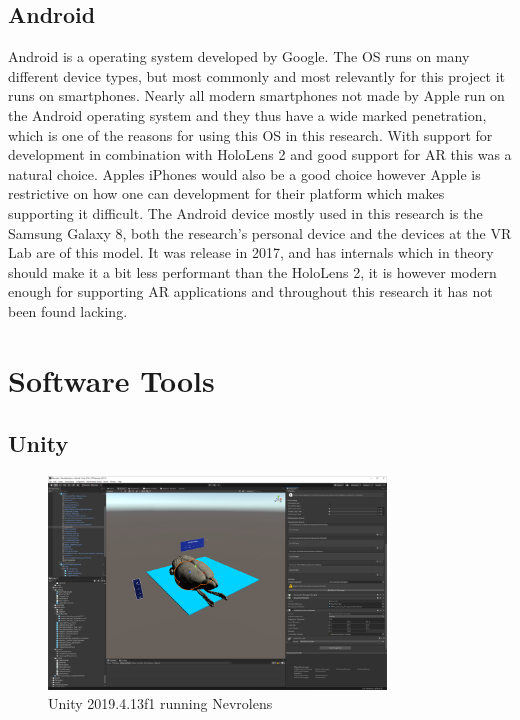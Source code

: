 \subsection*{Android} 

Android is a operating system developed by Google. The OS runs on many different device types, but most commonly and most relevantly for this project it runs on smartphones. Nearly all modern smartphones not made by Apple run on the Android operating system and they thus have a wide marked penetration, which is one of the reasons for using this OS in this research. With support for development in combination with HoloLens 2 and good support for AR this was a natural choice. Apples iPhones would also be a good choice however Apple is restrictive on how one can development for their platform which makes supporting it difficult. 
The Android device mostly used in this research is the Samsung Galaxy 8, both the research's personal device and the devices at the VR Lab are of this model. It was release in 2017, and has internals which in theory should make it a bit less performant than the HoloLens 2, it is however modern enough for supporting AR applications and throughout this research it has not been found lacking.

    

\section{Software Tools}\label{chap:tools}


\subsection*{Unity}\label{chap:unity}

\begin{figure}[ht]
    \centering
    \includegraphics[width=0.8\textwidth]{fig/unity_example.png}
    \caption{Unity 2019.4.13f1 running Nevrolens}
\end{figure}

